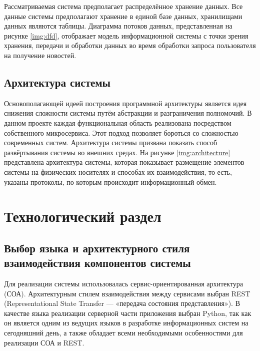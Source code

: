 \documentclass{bmstu-gost-7-32}
\begin{document}
Рассматриваемая система предполагает распределённое хранение данных.
Все данные системы предполагают хранение в единой базе данных, хранилищами данных являются таблицы.
Диаграмма потоков данных, представленная на рисунке \ref{img:dfd}, отображает модель информационной системы с точки зрения хранения, передачи и обработки данных во время обработки запроса пользователя на получение новостей.


\section*{Архитектура системы}

Основополагающей идеей построения программной архитектуры является идея снижения сложности системы путём абстракции и разграничения полномочий.
В данном проекте каждая функциональная область реализована посредством собственного микросервиса.
Этот подход позволяет бороться со сложностью современных систем.
Архитектура системы призвана показать способ развёртывания системы во внешних средах.
На рисунке \ref{img:architecture} представлена архитектура системы, которая показывает размещение элементов системы на физических носителях и способах их взаимодействия, то есть, указаны протоколы, по которым происходит информационный обмен.


\chapter*{Технологический раздел}

\section*{Выбор языка и архитектурного стиля взаимодействия компонентов системы}

Для реализации системы использовалась сервис-ориентированная архитектура (СОА).
Архитектурным стилем взаимодействия между сервисами выбран REST (Representational State Transfer — «передача состояния представления»).
В качестве языка реализации серверной части приложения выбран Python, так как он является одним из ведущих языков в разработке информационных систем на сегодняшний день, а также обладает всеми необходимыми особенностями для реализации СОА и REST.
\end{document}
